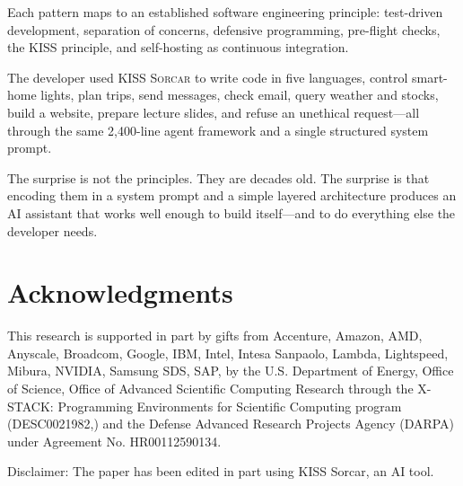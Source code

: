 \documentclass{article}
\newcommand{\kisssys}{\textsc{KISS Sorcar}}
\begin{document}
Each pattern maps to an established software engineering principle:
test-driven development, separation of concerns, defensive
programming, pre-flight checks, the KISS principle, and self-hosting
as continuous integration.

The developer used \kisssys{} to write code in five languages,
control smart-home lights, plan trips, send messages, check email,
query weather and stocks, build a website, prepare lecture slides,
and refuse an unethical request---all through the same 2,400-line
agent framework and a single structured system prompt.

The surprise is not the principles.
They are decades old.
The surprise is that encoding them in a system prompt and a simple
layered architecture produces an AI assistant that works well
enough to build itself---and to do everything else the developer
needs.

\section*{Acknowledgments}

This research is supported in part by gifts from Accenture, Amazon, AMD, Anyscale, Broadcom, Google, IBM, Intel, Intesa Sanpaolo, Lambda, Lightspeed, Mibura, NVIDIA, Samsung SDS, SAP, by the U.S. Department of Energy, Office of Science, Office of Advanced Scientific Computing Research through the X-STACK: Programming Environments for Scientific Computing program (DESC0021982,) and the Defense Advanced Research Projects Agency (DARPA) under Agreement No. HR00112590134.

Disclaimer: The paper has been edited in part using KISS Sorcar, an AI tool.


{ \small



}
\end{document}
